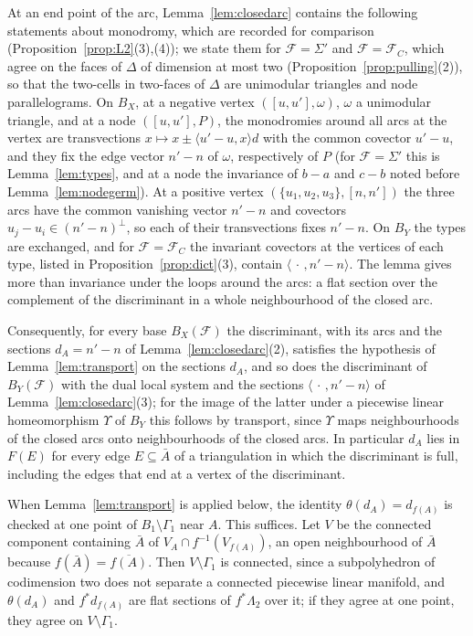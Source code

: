 At an end point of the arc, Lemma~\ref{lem:closedarc} contains the following statements about monodromy, which are
recorded for comparison (Proposition~\ref{prop:L2}(3),(4)); we state them for $\mathcal F=\Sigma'$ and $\mathcal F=\mathcal F_C$,
which agree on the faces of $\Delta$ of dimension at most two (Proposition~\ref{prop:pulling}(2)), so that the two-cells in
two-faces of $\Delta$ are unimodular triangles and node parallelograms. On $B_X$, at a negative vertex $([u,u'],\omega)$, $\omega$ a
unimodular triangle, and at a node $([u,u'],P)$, the monodromies around all arcs at the vertex are transvections
$x\mapsto x\pm\langle u'-u,x\rangle d$ with the common covector $u'-u$, and they fix the edge vector $n'-n$ of $\omega$,
respectively of $P$ (for $\mathcal F=\Sigma'$ this is Lemma~\ref{lem:types}, and at a node the invariance of $b-a$ and $c-b$
noted before Lemma~\ref{lem:nodegerm}). At a positive vertex $(\{u_1,u_2,u_3\},[n,n'])$ the three arcs have the common
vanishing vector $n'-n$ and covectors $u_j-u_i\in(n'-n)^\perp$, so each of their transvections fixes $n'-n$. On $B_Y$ the
types are exchanged, and for $\mathcal F=\mathcal F_C$ the invariant covectors at the vertices of each type, listed in
Proposition~\ref{prop:dict}(3), contain $\langle\,\cdot\,,n'-n\rangle$. The lemma gives more than invariance under the loops around the arcs: a flat section
over the complement of the discriminant in a whole neighbourhood of the closed arc.

Consequently, for every base $B_X(\mathcal F)$ the discriminant, with its arcs and the sections $d_A=n'-n$ of
Lemma~\ref{lem:closedarc}(2), satisfies the hypothesis of Lemma~\ref{lem:transport} on the sections $d_A$, and so does the discriminant of
$B_Y(\mathcal F)$ with the dual local system and the sections $\langle\,\cdot\,,n'-n\rangle$ of
Lemma~\ref{lem:closedarc}(3); for the image of the latter under a piecewise linear homeomorphism $\Upsilon$ of $B_Y$ this
follows by transport, since $\Upsilon$ maps neighbourhoods of the closed arcs onto neighbourhoods of the closed arcs. In
particular $d_A$ lies in $F(E)$ for every edge $E\subseteq\bar A$ of a triangulation in which the discriminant is full,
including the edges that end at a vertex of the discriminant.

When Lemma~\ref{lem:transport} is applied below, the identity $\theta(d_A)=d_{f(A)}$ is checked at one point of $B_1\setminus\Gamma_1$
near $A$. This suffices. Let $V$ be the connected component containing $\bar A$ of $V_A\cap f^{-1}(V_{f(A)})$, an open
neighbourhood of $\bar A$ because $f(\bar A)=\overline{f(A)}$. Then $V\setminus\Gamma_1$ is connected, since a subpolyhedron
of codimension two does not separate a connected piecewise linear manifold, and $\theta(d_A)$ and $f^*d_{f(A)}$ are flat
sections of $f^*\Lambda_2$ over it; if they agree at one point, they agree on $V\setminus\Gamma_1$.

